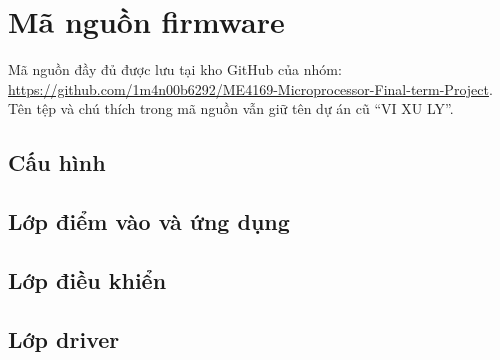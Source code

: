 \chapter{Mã nguồn firmware}
\label{app:firmware}

Mã nguồn đầy đủ được lưu tại kho GitHub của nhóm:\\
\url{https://github.com/1m4n00b6292/ME4169-Microprocessor-Final-term-Project}. Tên tệp và chú thích trong mã nguồn vẫn giữ tên dự án cũ ``VI XU LY''.

\section{Cấu hình}



\section{Lớp điểm vào và ứng dụng}




\section{Lớp điều khiển}



\section{Lớp driver}













